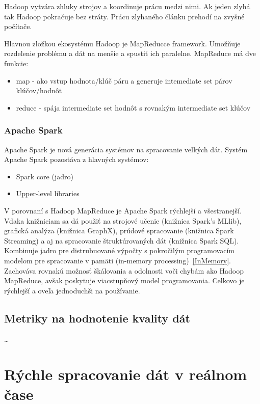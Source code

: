 \documentclass[10pt,twoside,slovak,a4paper]{article}
\begin{document}
Hadoop vytvára zhluky strojov a koordinuje prácu medzi nimi. Ak jeden zlyhá tak Hadoop pokračuje bez stráty. Prácu zlyhaného článku prehodí na zvyšné počítače.

Hlavnou zložkou ekosystému Hadoop je MapReducce framework. Umožňuje rozdelenie problému a dát na menšie a spustiť ich paralelne. MapReduce má dve funkcie:

\begin{itemize}
\item map - ako vstup hodnota/klúč páru a generuje intemediate set párov klúčov/hodnôt
\item reduce - spája intermediate set hodnôt s rovnakým intermediate set klúčov
\end{itemize}
\cite{ZakladneInfo}

\subsubsection {Apache Spark}

Apache Spark je nová generácia systémov na spracovanie veľkých dát. Systém Apache Spark pozostáva z hlavných systémov:
\begin{itemize}
\item Spark core (jadro)
\item Upper-level libraries
\end{itemize}
V porovnaní s Hadoop MapReduce je Apache Spark rýchlejší a všestranejší. Vďaka knižniciam sa dá použiť na strojové učenie (knižnica Spark’s MLlib), grafická analýza (knižnica GraphX), prúdové spracovanie (knižnica Spark Streaming) a aj na spracovanie štruktúrovaných dát (knižnica Spark SQL). Kombinuje jadro pre distrubuované výpočty s pokročilým programovacím modelom pre spracovanie v pamäti (in-memory processing)~\ref{InMemory}. Zachováva rovnakú možnosť škálovania a odolnosti voči chybám ako Hadoop MapReduce, avšak poskytuje viacstupňový model programovania. Celkovo je rýchlejší a oveľa jednoduchši na používanie.~\cite{Apache}

\subsection {Metriky na hodnotenie kvality dát} \label {Metriky}

\dots



\section {Rýchle spracovanie dát v reálnom čase} \label{RychleSpracovanie}
\end{document}
